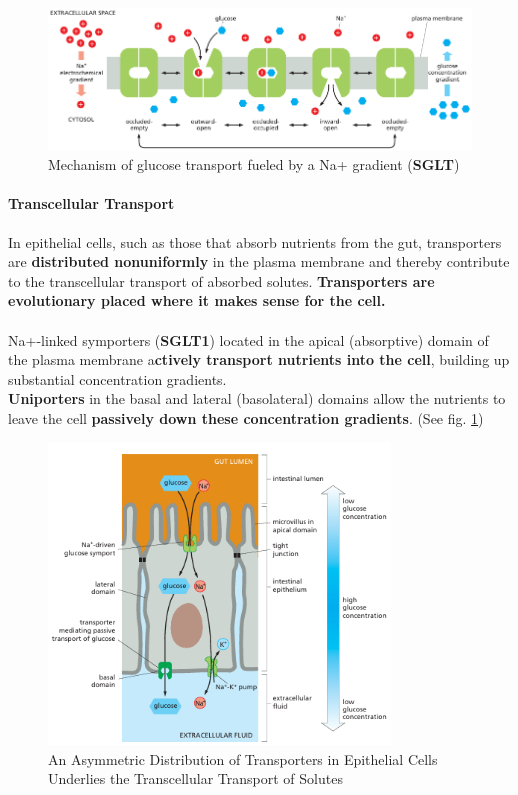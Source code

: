 \documentclass[../main.tex]{subfiles}
\begin{document}
\begin{figure}[H]
	\centering
	\includegraphics[width = 0.8 \textwidth]{11}
	\caption{Mechanism of glucose transport fueled by a Na+ gradient (\textbf{\gls{SGLT}})}
\end{figure}

\paragraph{Transcellular Transport}
In epithelial cells, such as those that absorb nutrients from the gut, transporters are \textbf{distributed nonuniformly} in the plasma membrane and thereby contribute to the transcellular transport of absorbed solutes. \textbf{Transporters are evolutionary placed where it makes sense for the cell.}\\
\\
Na+-linked symporters (\textbf{SGLT1}) located in the apical (absorptive) domain of the plasma membrane a\textbf{ctively transport nutrients into the cell}, building up substantial concentration gradients.\\
\textbf{Uniporters} in the basal and lateral (basolateral) domains allow the nutrients to leave the cell \textbf{passively down these concentration gradients}. (See fig. \ref{AsymmetrionDistributionofTransporters})

\begin{figure}[H]
	\centering
	\includegraphics[height = 8cm]{12}
	\caption{An Asymmetric Distribution of Transporters in Epithelial Cells Underlies the Transcellular Transport of Solutes}
	\label{AsymmetrionDistributionofTransporters}
\end{figure}
\end{document}
